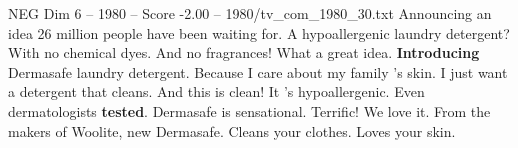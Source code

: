 \begin{textsample}{NEG Dim 6 – 1980 – Score -2.00 – 1980/tv\_com\_1980\_30.txt}  \label{ex:f6_neg_033}
Announcing an idea 26 million people have been waiting for.
A hypoallergenic laundry detergent?
With no chemical dyes.
And no fragrances!
What a great idea. \textbf{Introducing} Dermasafe laundry detergent.
Because I care about my family 's skin.
I just want a detergent that cleans.
And this is clean!
It 's hypoallergenic.
Even dermatologists \textbf{tested}.
Dermasafe is sensational.
Terrific!
We love it.
From the makers of Woolite, new Dermasafe.
Cleans your clothes.
Loves your skin.

\end{textsample}
